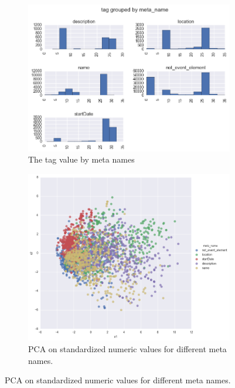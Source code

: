 \begin{figure}[h]
\begin{subfigure}{.5\textwidth}
  \centering
  \includegraphics[width=1\textwidth]{figures07/distrTagByMeta}
  \caption{The tag value by meta names}
  \label{fig:distrTagByMeta}
\end{subfigure}
\begin{subfigure}{.5\textwidth}
  \centering
    \includegraphics[width=1\textwidth]{figures07/pcatsne}
    \caption{PCA on standardized numeric values for different meta names.}
    \label{fig:pcatsne}
\end{subfigure}
\end{figure}

